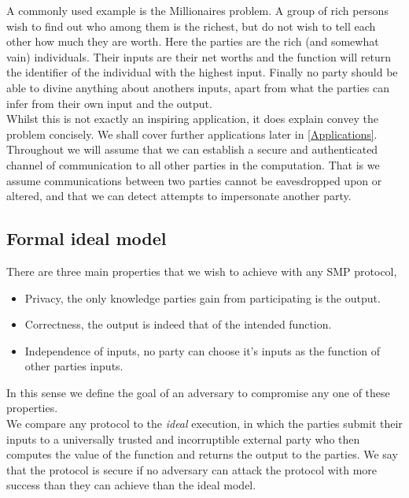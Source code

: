 \documentclass[a4paper,10pt]{article}
\begin{document}
      A commonly used example is the Millionaires problem. A group of rich persons wish to find out who among them is the richest, but do not wish to tell each other how much they are worth. Here the parties are the rich (and somewhat vain) individuals. Their inputs are their net worths and the function will return the identifier of the individual with the highest input. Finally no party should be able to divine anything about anothers inputs, apart from what the parties can infer from their own input and the output.\\
      
      Whilst this is not exactly an inspiring application, it does explain convey the problem concisely. We shall cover further applications later in \ref{Applications}.\\

      Throughout we will assume that we can establish a secure and authenticated channel of communication to all other parties in the computation. That is we assume communications between two parties cannot be eavesdropped upon or altered, and that we can detect attempts to impersonate another party.


    \subsection{Formal ideal model}
	There are three main properties that we wish to achieve with any SMP protocol,
	\begin{itemize}
		\item Privacy, the only knowledge parties gain from participating is the output.
		\item Correctness, the output is indeed that of the intended function.
		\item Independence of inputs, no party can choose it's inputs as the function of other parties inputs.
	\end{itemize}

	In this sense we define the goal of an adversary to compromise any one of these properties.\\

      We compare any protocol to the \emph{ideal} execution, in which the parties submit their inputs to a universally trusted and incorruptible external party who then computes the value of the function and returns the output to the parties. We say that the protocol is secure if no adversary can attack the protocol with more success than they can achieve than the ideal model.\\
\end{document}

